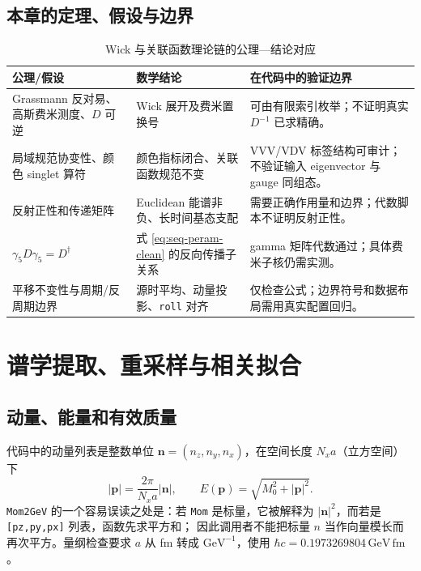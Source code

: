 \documentclass[UTF8,11pt,oneside]{ctexbook}
\begin{document}
\section{本章的定理、假设与边界}
\begin{table}[htbp]
\centering
\caption{Wick 与关联函数理论链的公理—结论对应}
\small
\begin{tabularx}{0.96\textwidth}{@{}P{2.8cm}Y Y@{}}
\toprule
公理/假设 & 数学结论 & 在代码中的验证边界\\
\midrule
Grassmann 反对易、高斯费米测度、\(D\) 可逆 & Wick 展开及费米置换号 & 可由有限索引枚举；不证明真实 \(D^{-1}\) 已求精确。\\
局域规范协变性、颜色 singlet 算符 & 颜色指标闭合、关联函数规范不变 & VVV/VDV 标签结构可审计；不验证输入 eigenvector 与 gauge 同组态。\\
反射正性和传递矩阵 & Euclidean 能谱非负、长时间基态支配 & 需要正确作用量和边界；代数脚本不证明反射正性。\\
\(\gamma_5D\gamma_5=D^\dagger\) & 式 \eqref{eq:seq-peram-clean} 的反向传播子关系 & gamma 矩阵代数通过；具体费米子核仍需实测。\\
平移不变性与周期/反周期边界 & 源时平均、动量投影、\texttt{roll} 对齐 & 仅检查公式；边界符号和数据布局需用真实配置回归。\\
\bottomrule
\end{tabularx}
\end{table}

\fi

\chapter{谱学提取、重采样与相关拟合}
\label{sec:spectrum}

\section{动量、能量和有效质量}
代码中的动量列表是整数单位 \(\boldsymbol n=(n_z,n_y,n_x)\)，在空间长度
\(N_xa\)（立方空间）下
\begin{equation}
 |\boldsymbol p|=\frac{2\pi}{N_xa}|\boldsymbol n|,
 \qquad
 E(\boldsymbol p)=\sqrt{M_0^2+|\boldsymbol p|^2}.
 \label{eq:mom2gev-clean}
\end{equation}
\texttt{Mom2GeV} 的一个容易误读之处是：若 \texttt{Mom} 是标量，它被解释为
\(|\boldsymbol n|^2\)，而若是 \texttt{[pz,py,px]} 列表，函数先求平方和；
因此调用者不能把标量 \(n\) 当作向量模长而再次平方。量纲检查要求
\(a\) 从 fm 转成 \(\mathrm{GeV}^{-1}\)，使用
\(\hbar c=0.1973269804\,\mathrm{GeV\,fm}\)。
\end{document}
